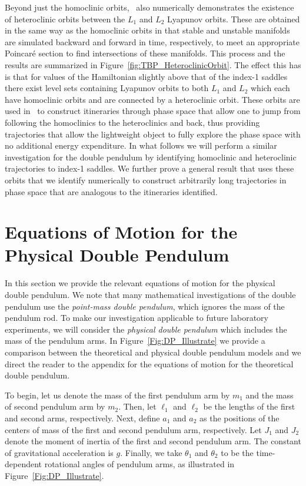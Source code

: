 \documentclass[11pt]{article}
\numberwithin{equation}{section}
\theoremstyle{plain}
\begin{document}
Beyond just the homoclinic orbits,~\cite{Koon} also numerically demonstrates the existence of heteroclinic orbits between the $L_1$ and $L_2$ Lyapunov orbits. These are obtained in the same way as the homoclinic orbits in that stable and unstable manifolds are simulated backward and forward in time, respectively, to meet an appropriate Poincar\'e section to find intersections of these manifolds. This process and the results are summarized in Figure~\ref{fig:TBP_HeteroclinicOrbit}. The effect this has is that for values of the Hamiltonian slightly above that of the index-1 saddles there exist level sets containing Lyapunov orbits to both $L_1$ and $L_2$ which each have homoclinic orbits and are connected by a heteroclinic orbit. These orbits are used in~\cite{Koon} to construct itineraries through phase space that allow one to jump from following the homoclinics to the heteroclinics and back, thus providing trajectories that allow the lightweight object to fully explore the phase space with no additional energy expenditure. In what follows we will perform a similar investigation for the double pendulum by identifying homoclinic and heteroclinic trajectories to index-1 saddles. We further prove a general result that uses these orbits that we identify numerically to construct arbitrarily long trajectories in phase space that are analogous to the itineraries identified.    





\section{Equations of Motion for the Physical Double Pendulum} \label{sec:EOM}

In this section we provide the relevant equations of motion for the physical double pendulum. We note that many mathematical investigations of the double pendulum use the {\em point-mass double pendulum}, which ignores the mass of the pendulum rod. To make our investigation applicable to future laboratory experiments, we will consider the {\em physical double pendulum} which includes the mass of the pendulum arms. In Figure~\ref{Fig:DP_Illustrate} we provide a comparison between the theoretical and physical double pendulum models and we direct the reader to the appendix for the equations of motion for the theoretical double pendulum. 

To begin, let us denote the mass of the first pendulum arm by $m_1$ and the mass of second pendulum arm by $m_2$. 
Then, let $\ell_1$ and $\ell_2$ be the lengths of the first and second arms, respectively. Next, define $a_1$ and $a_2$ as the positions of the centers of mass of the first and second pendulum arm, respectively. Let $J_1$ and $J_2$ denote the moment of inertia of the first and second pendulum arm. The constant of gravitational acceleration is $g$. Finally, we take $\theta_1$ and $\theta_2$ to be the time-dependent rotational angles of pendulum arms, as illustrated in Figure~\ref{Fig:DP_Illustrate}.
\end{document}
